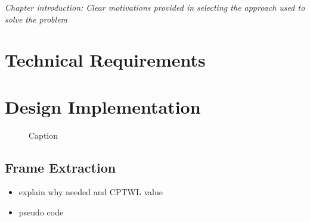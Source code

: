 \documentclass[class=report,11pt,crop=false]{standalone}
\begin{document}
\emph{Chapter introduction: Clear motivations provided in selecting the approach used to solve the problem}

\section{Technical Requirements}

\begin{table}[H]
    \centering
    \caption{Technical requirements considered when designing the \gls{qlp}.}
    \label{tab:technical_requirements}
\end{table}

\section{Design Implementation}
\begin{figure}[H]
    \centering
    \caption{Caption}
    \label{fig:enter-label}
\end{figure}
    \subsection{Frame Extraction}
        \begin{itemize}
            \item explain why needed and CPTWL value
            \item pseudo code
        \end{itemize}
\end{document}
